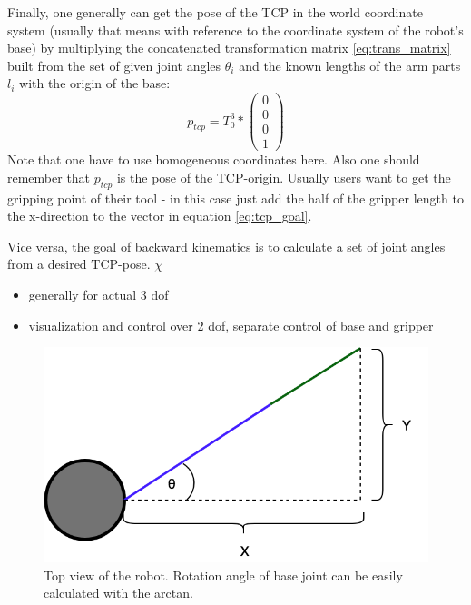\documentclass[conference]{IEEEtran}
\begin{document}
Finally, one generally can get the pose of the TCP in the world coordinate system (usually that means with reference to the coordinate system of the robot's base) by multiplying the concatenated transformation matrix \ref{eq:trans_matrix} built from the set of given joint angles $\theta_i$ and the known lengths of the arm parts $l_i$ with the origin of the base:
\begin{equation}\label{eq:tcp_goal}
p_{tcp} = T_0^3 * \begin{pmatrix}0\\0\\0\\1\end{pmatrix}
\end{equation}
Note that one have to use homogeneous coordinates here. Also one should remember that $p_{tcp}$ is the pose of the TCP-origin. Usually users want to get the gripping point of their tool - in this case just add the half of the gripper length to the x-direction to the vector in equation \ref{eq:tcp_goal}.
\\
\par

Vice versa, the goal of backward kinematics is to calculate a set of joint angles from a desired TCP-pose. $\chi$

\begin{itemize}
	\item generally for actual 3 dof
	\item visualization and control over 2 dof, separate control of base and gripper
\end{itemize}

\begin{figure}[htbp]
	\centerline{\includegraphics[scale=0.3]{img/kin_yaw_top_view.png}}
	\caption{Top view of the robot. Rotation angle of base joint can be easily calculated with the arctan.}
	\label{fig:yaw_calc}
\end{figure}
\end{document}
